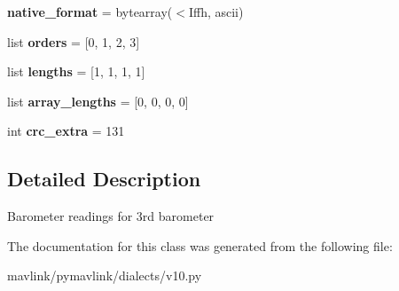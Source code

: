 \begin{DoxyCompactItemize}
{\bfseries native\+\_\+format} = bytearray(\textquotesingle{}$<$Iffh\textquotesingle{}, \textquotesingle{}ascii\textquotesingle{})
\item 
\mbox{\label{classpymavlink_1_1dialects_1_1v10_1_1MAVLink__scaled__pressure3__message_a81e4fd4d81d288fa5b0be654f7cb26ac}} 
list {\bfseries orders} = \mbox{[}0, 1, 2, 3\mbox{]}
\item 
\mbox{\label{classpymavlink_1_1dialects_1_1v10_1_1MAVLink__scaled__pressure3__message_a5d9c7efad7a6eef75d40f4cbc736e430}} 
list {\bfseries lengths} = \mbox{[}1, 1, 1, 1\mbox{]}
\item 
\mbox{\label{classpymavlink_1_1dialects_1_1v10_1_1MAVLink__scaled__pressure3__message_a7d1fbdcafaa0b37b29d499db65ea7457}} 
list {\bfseries array\+\_\+lengths} = \mbox{[}0, 0, 0, 0\mbox{]}
\item 
\mbox{\label{classpymavlink_1_1dialects_1_1v10_1_1MAVLink__scaled__pressure3__message_a4e282268357225f673424723661f095b}} 
int {\bfseries crc\+\_\+extra} = 131
\end{DoxyCompactItemize}


\subsection{Detailed Description}
\begin{DoxyVerb}Barometer readings for 3rd barometer
\end{DoxyVerb}
 

The documentation for this class was generated from the following file\+:\begin{DoxyCompactItemize}
\item 
mavlink/pymavlink/dialects/v10.\+py\end{DoxyCompactItemize}
